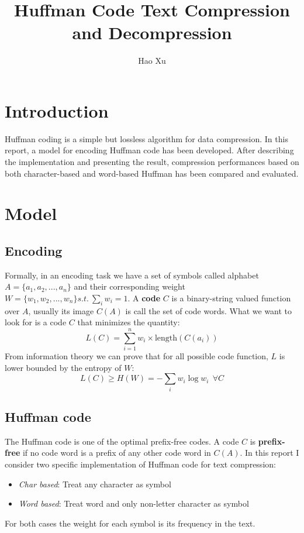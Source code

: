 \documentclass[journal, a4paper]{IEEEtran}
\begin{document}
	\title{Huffman Code Text Compression and Decompression}
	\author{Hao Xu}
	\maketitle


\section{Introduction}
	Huffman coding is a simple but lossless algorithm for data compression. In this report, a model for encoding Huffman code has been developed. After describing the implementation and presenting the result, compression performances based on both character-based and word-based Huffman has been compared and evaluated.

\section{Model}
    \subsection{Encoding}
        Formally, in an encoding task we have a set of symbols called alphabet $A=\{a_1, a_2, ..., a_n\}$ and their corresponding weight $W=\{w_1, w_2, ..., w_n\}s.t.\ \sum_i w_i=1$. A \textbf{code} $C$ is a binary-string valued function over $A$, usually its image $C(A)$ is call the set of code words. What we want to look for is a code $C$ that minimizes the quantity: 
        $$L(C)=\sum_{i=1}^n w_i \times \text{length}(C(a_i))$$
        From information theory we can prove that for all possible code function, $L$ is lower bounded by the entropy of $W$: 
        $$L(C)\geq H(W)=-\sum_i w_i \log w_i \ \ \forall C$$
    
    \subsection{Huffman code}
        The Huffman code is one of the optimal prefix-free codes. A code $C$ is \textbf{prefix-free} if no code word is a prefix of any other code word in $C(A)$. 
        In this report I consider two specific implementation of Huffman code for text compression:
        \begin{itemize}
            \item \textit{Char based}: Treat any character as symbol
            \item \textit{Word based}: Treat word and only non-letter character as  symbol
        \end{itemize}
        For both cases the weight for each symbol is its frequency in the text.
\end{document}
